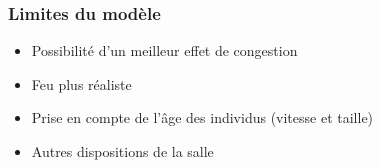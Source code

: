 \documentclass[10pt]{beamer}
\begin{document}
\begin{frame}
	\frametitle{\textbf {\Large Limites du modèle}}
	\begin{block}{}
		\medskip
		\begin{itemize}
			\item \large Possibilité d'un meilleur effet de congestion
			\medskip
			\item \large Feu plus réaliste 
			\medskip
			\item \large Prise en compte de l'âge des individus (vitesse et taille)
			\medskip
			\item Autres dispositions de la salle
		\end{itemize}
	\end{block}

\end{frame}
\end{document}
